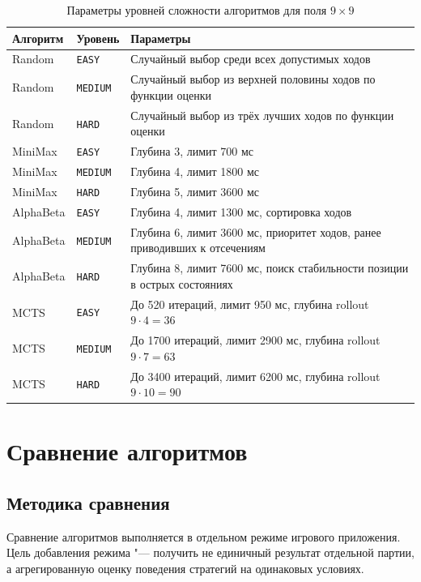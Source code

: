\documentclass[a4paper,12pt]{diplom}
\begin{document}
\begin{table}[h]
    \centering
    \caption{Параметры уровней сложности алгоритмов для поля $9\times9$}
    \label{tab:all_difficulty_params}
    \begin{tabular}{llp{8cm}}
        \toprule
        Алгоритм & Уровень & Параметры \\
        \midrule
        Random & \texttt{EASY} & Случайный выбор среди всех допустимых ходов \\
        Random & \texttt{MEDIUM} & Случайный выбор из верхней половины ходов по функции оценки \\
        Random & \texttt{HARD} & Случайный выбор из трёх лучших ходов по функции оценки \\
        MiniMax & \texttt{EASY} & Глубина 3, лимит 700 мс \\
        MiniMax & \texttt{MEDIUM} & Глубина 4, лимит 1800 мс \\
        MiniMax & \texttt{HARD} & Глубина 5, лимит 3600 мс \\
        AlphaBeta & \texttt{EASY} & Глубина 4, лимит 1300 мс, сортировка ходов \\
        AlphaBeta & \texttt{MEDIUM} & Глубина 6, лимит 3600 мс, приоритет ходов, ранее приводивших к отсечениям \\
        AlphaBeta & \texttt{HARD} & Глубина 8, лимит 7600 мс, поиск стабильности позиции в острых состояниях \\
        MCTS & \texttt{EASY} & До 520 итераций, лимит 950 мс, глубина rollout $9\cdot4=36$ \\
        MCTS & \texttt{MEDIUM} & До 1700 итераций, лимит 2900 мс, глубина rollout $9\cdot7=63$ \\
        MCTS & \texttt{HARD} & До 3400 итераций, лимит 6200 мс, глубина rollout $9\cdot10=90$ \\
        \bottomrule
    \end{tabular}
\end{table}

\chapter{Сравнение алгоритмов}

\section{Методика сравнения}

Сравнение алгоритмов выполняется в отдельном режиме игрового приложения. Цель добавления режима "--- получить не единичный результат отдельной партии, а агрегированную оценку поведения стратегий на одинаковых условиях.
\end{document}
